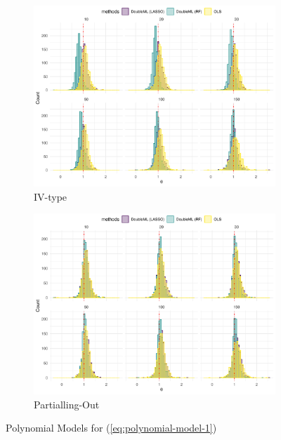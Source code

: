 \documentclass[en,12pt,mtpro2]{elegantpaper}
\begin{document}
\begin{figure}[htp]
    \centering
    \begin{subfigure}{.41\textwidth}
        \centering
        \includegraphics[width=\linewidth]{figures/simulation-polynomial3 (IV-type).pdf}
        \caption{IV-type}
    \end{subfigure}
    \begin{subfigure}{.41\textwidth}
        \centering
        \includegraphics[width=\linewidth]{figures/simulation-polynomial3 (partialling out).pdf}
        \caption{Partialling-Out}
    \end{subfigure}
    \caption{Polynomial Models for (\ref{eq:polynomial-model-1})}
\end{figure}
\end{document}
